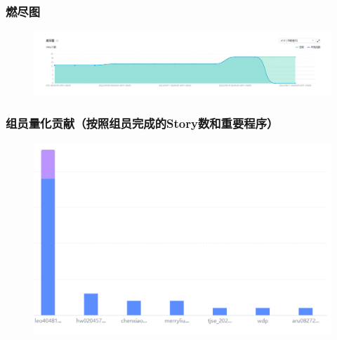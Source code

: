 \begin{frame}
    \frametitle{燃尽图}
    \begin{figure}[H]
        \centering
        \includegraphics[width=\textwidth]{contents/figure/burnout.png}
    \end{figure}
\end{frame}

\begin{frame}
    \frametitle{组员量化贡献（按照组员完成的Story数和重要程序）}
    \begin{figure}[H]
        \centering
        \includegraphics[width=\textwidth]{contents/figure/contribution.png}
    \end{figure}
\end{frame}

